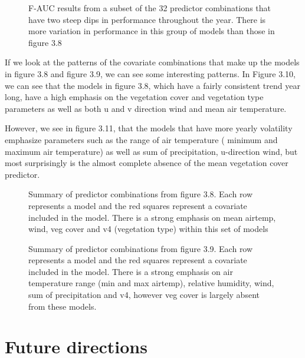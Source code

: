 \begin{figure} [!ht]
\centerline{}
\caption{F-AUC results from a subset of the 32 predictor combinations that have two steep dips in performance throughout the year. There is more variation in performance in this group of models than those in figure 3.8 }
\label{fig6}
\end{figure}

\noindent  If we look at the patterns of the covariate combinations that make up the models in figure 3.8 and figure 3.9, we can see some interesting patterns. In Figure 3.10, we can see that the models in figure 3.8, which have a fairly consistent trend year long, have a high emphasis on the vegetation cover and vegetation type parameters as well as both u and v direction wind and mean air temperature. \newline

\noindent However, we see in figure 3.11, that the models that have more yearly volatility emphasize parameters such as the range of air temperature ( minimum and maximum air temperature) as well as sum of precipitation, u-direction wind, but most surprisingly is the almost complete absence of the mean vegetation cover predictor. \newline

\begin{figure} [t]
\centerline{}
\caption{Summary of predictor combinations from figure 3.8. Each row represents a model and the red squares represent a covariate included in the model. There is a strong emphasis on mean airtemp, wind, veg cover and v4 (vegetation type) within this set of models}
\label{fig6}
\end{figure}

\begin{figure} [t]
\centerline{}
\caption{Summary of predictor combinations from figure 3.9. Each row represents a model and the red squares represent a covariate included in the model. There is a strong emphasis on air temperature range (min and max airtemp), relative humidity, wind, sum of precipitation and v4, however veg cover is largely absent from these models. }
\label{fig6}
\end{figure}

  
\section{Future directions}


